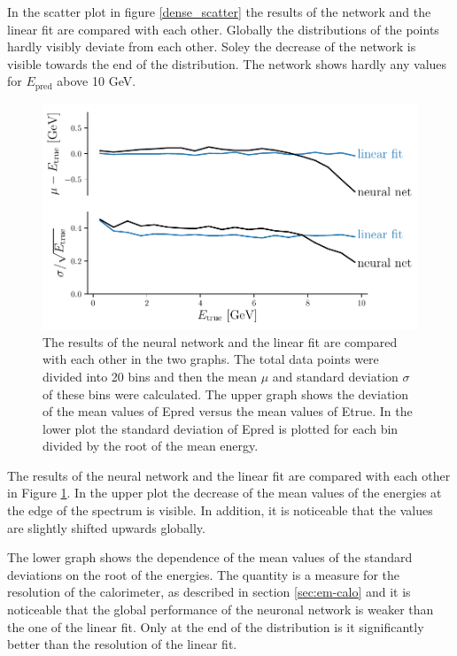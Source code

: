 \documentclass[12pt, a4paper]{thesis}
\begin{document}
In the scatter plot in figure \ref{dense_scatter} the results of the
network and the linear fit are compared with each other. Globally the
distributions of the points hardly visibly deviate from each
other. Soley the decrease of the network is visible towards the end of
the distribution.  The network shows hardly any values for
\(E_{\text{pred}}\) above 10 GeV.

\begin{figure}[H]
  \centering
  \includegraphics[width=.9\linewidth]{../images/dense_res.pdf}
  \caption{ The results of the neural network and the linear fit are
    compared with each other in the two graphs. The total data points
    were divided into 20 bins and then the mean \(\mu\) and standard
    deviation \(\sigma\) of these bins were calculated. The upper graph
    shows the deviation of the mean values of Epred versus the mean
    values of Etrue. In the lower plot the standard deviation of Epred
    is plotted for each bin divided by the root of the mean
    energy. }
  \label{dense_res}
\end{figure} 

The results of the neural network and the linear fit are compared with each
other in Figure \ref{dense_res}. In the upper plot the decrease of the mean values
of the energies at the edge of the spectrum is visible. In addition, it is
noticeable that the values are slightly shifted upwards globally.

The lower graph shows the dependence of the mean values of the
standard deviations on the root of the energies. The quantity is a
measure for the resolution of the calorimeter, as described in section
\ref{sec:em-calo} and it is noticeable that the global performance of
the neuronal network is weaker than the one of the linear fit. Only at
the end of the distribution is it significantly better than the
resolution of the linear fit.
\end{document}
